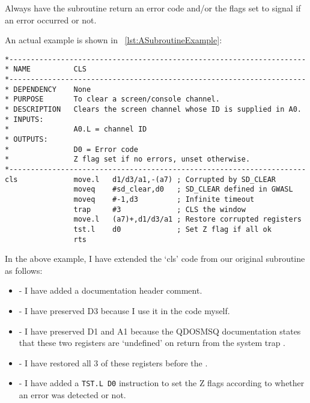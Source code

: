Always have the subroutine return an error code and/or the flags set
    to signal if an error occurred or not.

An actual example is shown in \lstlistingname~\ref{lst:ASubroutineExample}:

\begin{lstlisting}[firstnumber=1,caption={A Subroutine Example},label={lst:ASubroutineExample}]
*---------------------------------------------------------------------
* NAME          CLS
*---------------------------------------------------------------------
* DEPENDENCY    None
* PURPOSE       To clear a screen/console channel.
* DESCRIPTION   Clears the screen channel whose ID is supplied in A0.
* INPUTS:
*               A0.L = channel ID
* OUTPUTS:
*               D0 = Error code
*               Z flag set if no errors, unset otherwise.
*---------------------------------------------------------------------
cls             move.l   d1/d3/a1,-(a7) ; Corrupted by SD_CLEAR
                moveq    #sd_clear,d0   ; SD_CLEAR defined in GWASL
                moveq    #-1,d3         ; Infinite timeout
                trap     #3             ; CLS the window
                move.l   (a7)+,d1/d3/a1 ; Restore corrupted registers
                tst.l    d0             ; Set Z flag if all ok
                rts
\end{lstlisting}

In the above example, I have extended the `cls' code from our
    original subroutine as follows:
\begin{itemize}[itemsep=0pt]

\item{}-{} I have added a documentation header comment.


\item{}-{} I have preserved D3 because I use it in the code
        myself.


\item{}-{} I have preserved D1 and A1 because the QDOSMSQ documentation
        states that these two registers are `undefined' on return from the
        system trap .


\item{}-{} I have restored all 3 of these registers before the
        .


\item{}-{} I have added a \lstinline{TST.L D0} instruction to set the Z flags
        according to whether an error was detected or not.

\end{itemize}

